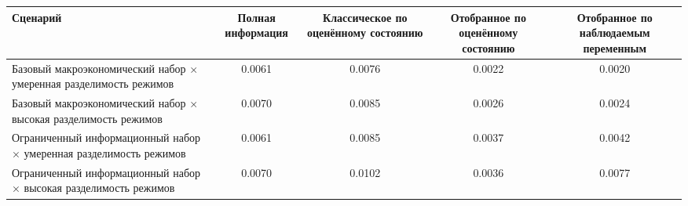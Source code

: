 \begin{tabular}{lcccc}
\toprule
Сценарий & Полная информация & Классическое по оценённому состоянию & Отобранное по оценённому состоянию & Отобранное по наблюдаемым переменным \\
\midrule
Базовый макроэкономический набор × умеренная разделимость режимов & 0.0061 & 0.0076 & 0.0022 & 0.0020 \\
Базовый макроэкономический набор × высокая разделимость режимов & 0.0070 & 0.0085 & 0.0026 & 0.0024 \\
Ограниченный информационный набор × умеренная разделимость режимов & 0.0061 & 0.0085 & 0.0037 & 0.0042 \\
Ограниченный информационный набор × высокая разделимость режимов & 0.0070 & 0.0102 & 0.0036 & 0.0077 \\
\bottomrule
\end{tabular}